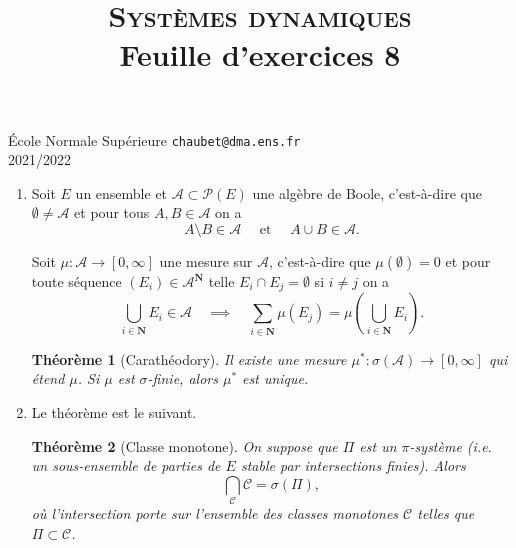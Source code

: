 \documentclass[a4paper,12pt,openany]{article}
\title{\textsc{Syst\`emes dynamiques} \\ Feuille d'exercices 8}
\date{}
\author{}
\theoremstyle{plain}
\newtheorem*{thm*}{Th\'eor\`eme}
\theoremstyle{definition}
\newcommand{\N}{\mathbf{N}}
\newcommand{\Ccal}{\mathcal{C}}
\newcommand{\Acal}{\mathcal{A}}
\newcommand{\Pcal}{\mathcal{P}}
\begin{document}
{\noindent \'Ecole Normale Sup\'erieure  \hfill  \texttt{chaubet@dma.ens.fr} } \\
{2021/2022 \hfill}

{\let\newpage\relax\maketitle}
\maketitle

 \vspace{1.5mm} 
\begin{enumerate}
\item Soit $E$ un ensemble et $\Acal \subset \Pcal(E)$ une alg\`ebre de Boole, c'est-\`a-dire que $\emptyset \neq \Acal$ et pour tous $A,B \in \Acal$ on a
$$A \setminus B \in \Acal \quad \text{ et } \quad A \cup B \in \Acal.$$

Soit $\mu : \Acal \to [0, \infty]$ une mesure sur $\Acal$, c'est-\`a-dire que $\mu(\emptyset) = 0$ et pour toute s\'equence $(E_i) \in \Acal^\N$ telle $E_i \cap E_j = \emptyset$ si $i \neq j$ on a 
$$
\bigcup_{i \in \N} E_i \in \Acal \quad \implies \quad \sum_{i\in \N} \mu(E_j) = \mu \left(\bigcup_{i \in \N} E_i\right).
$$
\begin{thm*}[Carath\'eodory]
Il existe une mesure $\mu^* : \sigma(\Acal) \to [0, \infty]$ qui \'etend $\mu$. Si $\mu$ est $\sigma$-finie, alors $\mu^*$ est unique.
\end{thm*}

\item Le th\'eor\`eme est le suivant.
\begin{thm*}[Classe monotone]
On suppose que $\Pi$ est un $\pi$-syst\`eme (i.e. un sous-ensemble de parties de $E$ stable par intersections finies). Alors
$$
\bigcap_\Ccal \Ccal = \sigma(\Pi),
$$
o\`u l'intersection porte sur l'ensemble des classes monotones $\Ccal$ telles que $\Pi \subset \Ccal$.
\end{thm*}
\end{enumerate}
\vspace{0.6cm}

 \vspace{1.5mm} 
\end{document}
